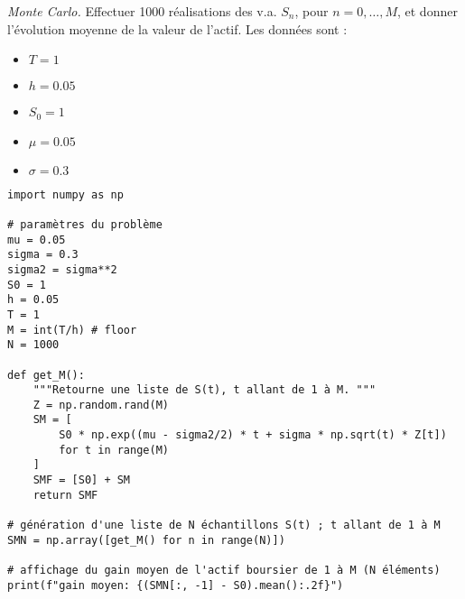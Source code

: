 \documentclass[answers, 10pt]{exam}
\begin{document}
\begin{questions}
	\question
	
	\textit{Monte Carlo.} Effectuer 1000 réalisations des v.a. $S_n$, pour
	$n=0,\dots,M$, et donner l'évolution moyenne de la valeur de l'actif.
	Les données sont : 
	
	\begin{itemize}
		\item $T=1$
		\item $h = 0.05$
		\item $S_0 = 1$
		\item $\mu = 0.05$
		\item $ \sigma = 0.3$
	\end{itemize}

	\begin{solutionorbox}
	\begin{verbatim}
import numpy as np

# paramètres du problème
mu = 0.05
sigma = 0.3
sigma2 = sigma**2
S0 = 1
h = 0.05
T = 1
M = int(T/h) # floor
N = 1000

def get_M():
    """Retourne une liste de S(t), t allant de 1 à M. """
    Z = np.random.rand(M)
    SM = [
        S0 * np.exp((mu - sigma2/2) * t + sigma * np.sqrt(t) * Z[t]) 
        for t in range(M)
    ]
    SMF = [S0] + SM
    return SMF

# génération d'une liste de N échantillons S(t) ; t allant de 1 à M
SMN = np.array([get_M() for n in range(N)])

# affichage du gain moyen de l'actif boursier de 1 à M (N éléments)
print(f"gain moyen: {(SMN[:, -1] - S0).mean():.2f}")
	\end{verbatim}
		
	\end{solutionorbox}

\end{questions}
\end{document}
